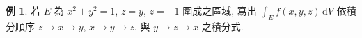 \documentclass[12pt]{extarticle}
\newcommand{\ds}{\displaystyle}
\theoremstyle{definition}
\newtheorem*{ex}{例}
\newtheorem*{sol}{解}
\begin{document}
{%
%

\begin{ex}
  若 $E$ 為 $x^2 + y^2 = 1$, $z = y$, $z = -1$ 圍成之區域, 寫出 $\ds\int_E f(x, y, z)\,\text{d}V$ 依積分順序 $z\to x\to y$, $x\to y\to z$, 與 $y\to z\to x$ 之積分式.
\end{ex}

}
\end{document}
